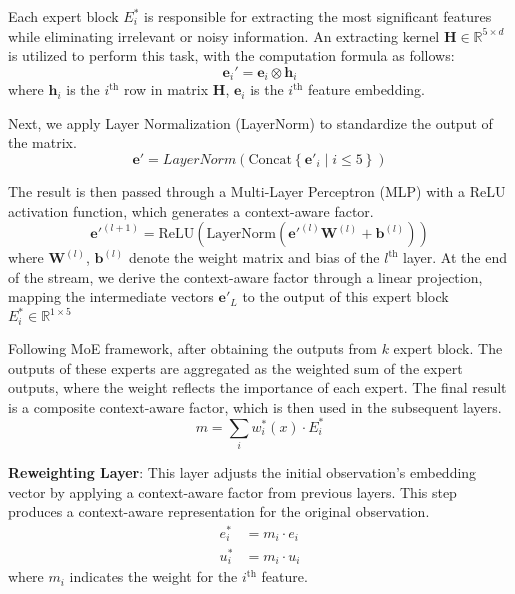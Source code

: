 \documentclass[preprint,12pt]{elsarticle}
\begin{document}
Each expert block $E^*_{i}$ is responsible for extracting the most significant features while eliminating irrelevant or noisy information. An extracting kernel $\mathbf{H} \in \mathbb{R}^{5 \times d}$ is utilized to perform this task, with the computation formula as follows: 
\begin{equation}
\mathbf{e}_i' = \mathbf{e}_i \otimes \mathbf{h}_i
\end{equation}
where \(\mathbf{h}_i\) is the \(i^{\text{th}}\) row in matrix \(\mathbf{H}\), \(\mathbf{e}_i\) is the \(i^{\text{th}}\) feature embedding.

Next, we apply Layer Normalization (LayerNorm) to standardize the output of the matrix. 
\begin{equation}
\mathbf{e}' = LayerNorm \left( \text{Concat} \left\{ \mathbf{e}'_i \mid i \leq 5 \right\} \right)
\end{equation}

The result is then passed through a Multi-Layer Perceptron (MLP) with a ReLU activation function, which generates a context-aware factor.
\begin{equation}
\mathbf{e}'^{(l+1)} = \text{ReLU}\left( \text{LayerNorm}\left( \mathbf{e}'^{(l)} \mathbf{W}^{(l)} + \mathbf{b}^{(l)} \right) \right)
\end{equation}
where \(\mathbf{W}^{(l)}\), \(\mathbf{b}^{(l)}\) denote the weight matrix and bias of the \(l^{\text{th}}\) layer. At the end of the stream, we derive the context-aware factor through a linear projection, mapping the intermediate vectors $\mathbf{e}'_L$ to the output of this expert block  $E^*_i\in\mathbb{R}^{1 \times 5} $

Following MoE framework, after obtaining the outputs from $k$ expert block. The outputs of these experts are aggregated as the weighted sum of the expert outputs, where the weight reflects the importance of each expert. The final result is a composite context-aware factor, which is then used in the subsequent layers.
\begin{equation}
m = \sum_{i} w^*_i(x) \cdot E^*_i
\end{equation}

\noindent\textbf{Reweighting Layer}: This layer adjusts the initial observation’s embedding vector by applying a context-aware factor from previous layers. This step produces a context-aware representation for the original observation. 
\begin{align}
e_i^* &= m_{i}\cdot e_i \\
u_i^* &= m_{i}\cdot u_i
\end{align}
where $ m_{i}$ indicates the weight for the $i^{\text{th}}$ feature.
\end{document}
